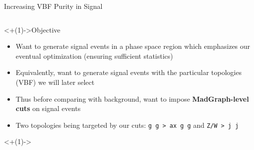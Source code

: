 \documentclass[]{beamer}
\begin{document}
\begin{frame}{Increasing VBF Purity in Signal}
    \begin{columns}
        \begin{column}{0.45\linewidth}
            \begin{block}<+(1)->{Objective}
                \begin{itemize}[<+(1)->]
                    \item Want to generate signal events in a phase space region which emphasizes our eventual optimization (ensuring sufficient statistics)
                    \item Equivalently, want to generate signal events with the particular topologies (VBF) we will later select
                    \item Thus before comparing with background, want to impose \textbf{MadGraph-level cuts} on signal events
                    \item Two topologies being targeted by our cuts: \texttt{g g > ax g g} and \texttt{Z/W > j j}
                \end{itemize}
            \end{block}
            
            \smallskip
            
            \centering
            \uncover<+(1)->{
                }
\end{column}
\end{columns}
\end{frame}
\end{document}
